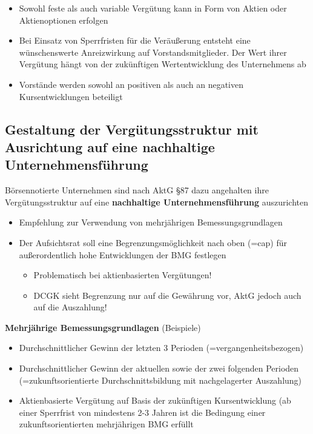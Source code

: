 \documentclass[
]{article}
\providecommand{\tightlist}{%
  \setlength{\itemsep}{0pt}\setlength{\parskip}{0pt}}
\begin{document}
\begin{itemize}
\tightlist
\item
  Sowohl feste als auch variable Vergütung kann in Form von Aktien oder
  Aktienoptionen erfolgen
\item
  Bei Einsatz von Sperrfristen für die Veräußerung entsteht eine
  wünschenswerte Anreizwirkung auf Vorstandsmitglieder. Der Wert ihrer
  Vergütung hängt von der zukünftigen Wertentwicklung des Unternehmens
  ab
\item
  Vorstände werden sowohl an positiven als auch an negativen
  Kursentwicklungen beteiligt
\end{itemize}

\hypertarget{gestaltung-der-verguxfctungsstruktur-mit-ausrichtung-auf-eine-nachhaltige-unternehmensfuxfchrung}{%
\subsection{Gestaltung der Vergütungsstruktur mit Ausrichtung auf eine
nachhaltige
Unternehmensführung}\label{gestaltung-der-verguxfctungsstruktur-mit-ausrichtung-auf-eine-nachhaltige-unternehmensfuxfchrung}}

Börsennotierte Unternehmen sind nach AktG §87 dazu angehalten ihre
Vergütungsstruktur auf eine \textbf{nachhaltige Unternehmensführung}
auszurichten

\begin{itemize}
\item
  Empfehlung zur Verwendung von mehrjährigen Bemessungsgrundlagen
\item
  Der Aufsichtsrat soll eine Begrenzungsmöglichkeit nach oben (=cap) für
  außerordentlich hohe Entwicklungen der BMG festlegen

  \begin{itemize}
  \tightlist
  \item
    Problematisch bei aktienbasierten Vergütungen!
  \item
    DCGK sieht Begrenzung nur auf die Gewährung vor, AktG jedoch auch
    auf die Auszahlung!
  \end{itemize}
\end{itemize}

\textbf{Mehrjährige Bemessungsgrundlagen} (Beispiele)

\begin{itemize}
\tightlist
\item
  Durchschnittlicher Gewinn der letzten 3 Perioden
  (=vergangenheitsbezogen)
\item
  Durchschnittlicher Gewinn der aktuellen sowie der zwei folgenden
  Perioden (=zukunftsorientierte Durchschnittsbildung mit nachgelagerter
  Auszahlung)
\item
  Aktienbasierte Vergütung auf Basis der zukünftigen Kursentwicklung (ab
  einer Sperrfrist von mindestens 2-3 Jahren ist die Bedingung einer
  zukunftsorientierten mehrjährigen BMG erfüllt
\end{itemize}
\end{document}

